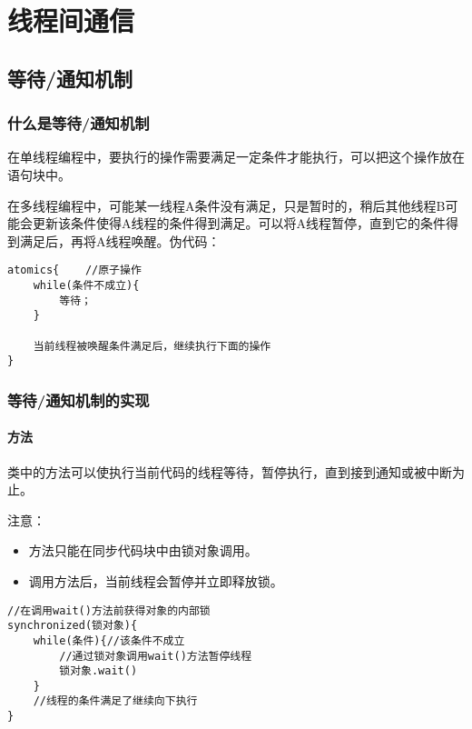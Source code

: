 \documentclass[a4paper]{report}
\begin{document}
\chapter{线程间通信}
\section{等待/通知机制}
\subsection{什么是等待/通知机制}
在单线程编程中，要执行的操作需要满足一定条件才能执行，可以把这个操作放在语句块中。

在多线程编程中，可能某一线程A条件没有满足，只是暂时的，稍后其他线程B可能会更新该条件使得A线程的条件得到满足。可以将A线程暂停，直到它的条件得到满足后，再将A线程唤醒。伪代码：
\begin{lstlisting}
atomics{    //原子操作
    while(条件不成立){
        等待；
    }

    当前线程被唤醒条件满足后，继续执行下面的操作
}
\end{lstlisting}
\subsection{等待/通知机制的实现}
\subsubsection{方法}
类中的方法可以使执行当前代码的线程等待，暂停执行，直到接到通知或被中断为止。

注意：
\begin{itemize}
  \item {}方法只能在同步代码块中由锁对象调用。
  \item 调用方法后，当前线程会暂停并立即释放锁。
\end{itemize}
\begin{lstlisting}
//在调用wait()方法前获得对象的内部锁
synchronized(锁对象){
    while(条件){//该条件不成立
        //通过锁对象调用wait()方法暂停线程
        锁对象.wait()
    }
    //线程的条件满足了继续向下执行
}
\end{lstlisting}
\end{document}
